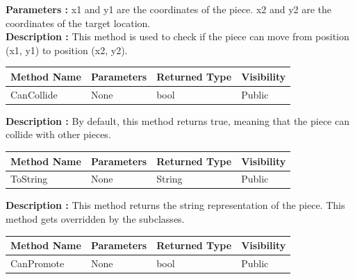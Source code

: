 \documentclass[12pt]{article}
\begin{document}
    \textbf{Parameters :} x1 and y1 are the coordinates of the piece.
    x2 and y2 are the coordinates of the target location.
\\
    \textbf{Description :} This method is used to check if the piece can move from position (x1, y1) to position (x2, y2).

\begin{table}[H]
    \begin{tabular}{|l|l|l|l|}
    \hline
    \rowcolor[HTML]{EFEFEF} 
    \cellcolor[HTML]{EFEFEF}\textbf{Method Name} & \textbf{Parameters}  & \textbf{Returned Type} & \textbf{Visibility} \\ \hline
    CanCollide                                   & None                 & bool                   & Public              \\ \hline
    \end{tabular}
\end{table}

    \textbf{Description :} By default, this method returns true, meaning that the piece can collide with other pieces.

\begin{table}[H]
    \begin{tabular}{|l|l|l|l|}
    \hline
    \rowcolor[HTML]{EFEFEF} 
    \cellcolor[HTML]{EFEFEF}\textbf{Method Name} & \textbf{Parameters}  & \textbf{Returned Type} & \textbf{Visibility} \\ \hline
    ToString                                   & None                 & String                   & Public              \\ \hline
    \end{tabular}
\end{table}

    \textbf{Description :} This method returns the string representation of the piece.
    This method gets overridden by the subclasses.

\begin{table}[H]
    \begin{tabular}{|l|l|l|l|}
    \hline
    \rowcolor[HTML]{EFEFEF} 
    \cellcolor[HTML]{EFEFEF}\textbf{Method Name} & \textbf{Parameters}  & \textbf{Returned Type} & \textbf{Visibility} \\ \hline
    CanPromote                                   & None                 & bool                   & Public              \\ \hline
    \end{tabular}
\end{table}
\end{document}
